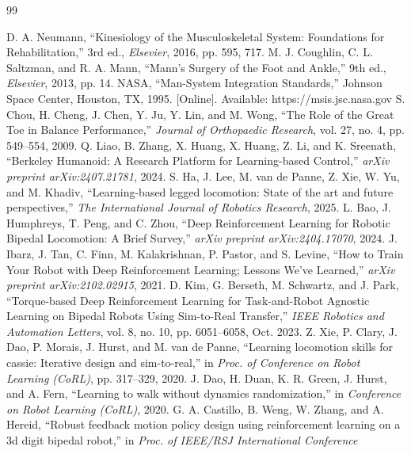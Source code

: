 \documentclass[10pt,twocolumn]{ICCAS}
\begin{document}
%
\begin{thebibliography}{99}

D. A. Neumann, ``Kinesiology of the Musculoskeletal System: Foundations for Rehabilitation,'' 3rd ed., \textit{Elsevier}, 2016, pp. 595, 717.
M. J. Coughlin, C. L. Saltzman, and R. A. Mann, ``Mann's Surgery of the Foot and Ankle,'' 9th ed., \textit{Elsevier}, 2013, pp. 14.
NASA, ``Man-System Integration Standards,'' Johnson Space Center, Houston, TX, 1995. [Online]. Available: https://msis.jsc.nasa.gov
S. Chou, H. Cheng, J. Chen, Y. Ju, Y. Lin, and M. Wong, ``The Role of the Great Toe in Balance Performance,'' \textit{Journal of Orthopaedic Research}, vol. 27, no. 4, pp. 549--554, 2009.
Q. Liao, B. Zhang, X. Huang, X. Huang, Z. Li, and K. Sreenath, ``Berkeley Humanoid: A Research Platform for Learning-based Control,'' \textit{arXiv preprint arXiv:2407.21781}, 2024.
S. Ha, J. Lee, M. van de Panne, Z. Xie, W. Yu, and M. Khadiv, ``Learning-based legged locomotion: State of the art and future perspectives,'' \textit{The International Journal of Robotics Research}, 2025.
L. Bao, J. Humphreys, T. Peng, and C. Zhou, ``Deep Reinforcement Learning for Robotic Bipedal Locomotion: A Brief Survey,'' \textit{arXiv preprint arXiv:2404.17070}, 2024.
J. Ibarz, J. Tan, C. Finn, M. Kalakrishnan, P. Pastor, and S. Levine, ``How to Train Your Robot with Deep Reinforcement Learning; Lessons We've Learned,'' \textit{arXiv preprint arXiv:2102.02915}, 2021.
D. Kim, G. Berseth, M. Schwartz, and J. Park, ``Torque-based Deep Reinforcement Learning for Task-and-Robot Agnostic Learning on Bipedal Robots Using Sim-to-Real Transfer,'' \textit{IEEE Robotics and
Automation Letters}, vol. 8, no. 10, pp. 6051--6058, Oct. 2023.
Z. Xie, P. Clary, J. Dao, P. Morais, J. Hurst, and M. van de Panne, ``Learning locomotion skills for cassie: Iterative design and sim-to-real,'' in \textit{Proc. of Conference on Robot Learning (CoRL)},
pp. 317--329, 2020.
J. Dao, H. Duan, K. R. Green, J. Hurst, and A. Fern, ``Learning to walk without dynamics randomization,'' in \textit{Conference on Robot Learning (CoRL)}, 2020.
G. A. Castillo, B. Weng, W. Zhang, and A. Hereid, ``Robust feedback motion policy design using reinforcement learning on a 3d digit bipedal robot,'' in \textit{Proc. of IEEE/RSJ International Conference
}
\end{thebibliography}
\end{document}
